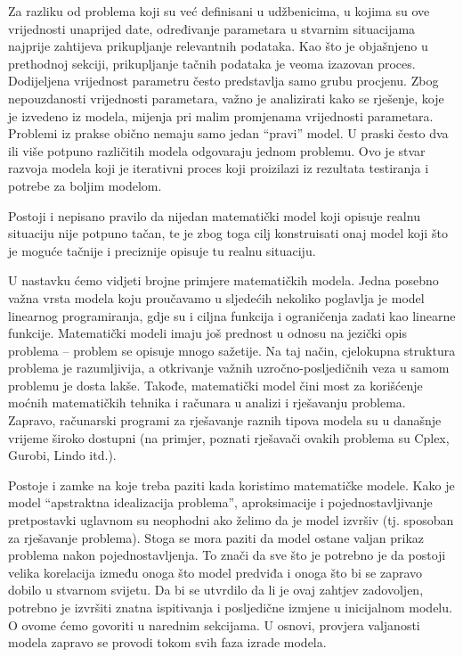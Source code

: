 \documentclass[a4paper, utf8, 11pt, colorlinks]{book}
\begin{document}
Za razliku od problema koji su već definisani u udžbenicima, u kojima su ove vrijednosti unaprijed date,   određivanje parametara u stvarnim situacijama najprije zahtijeva prikupljanje relevantnih podataka. Kao što je objašnjeno u prethodnoj sekciji,  prikupljanje tačnih podataka je veoma izazovan proces.  Dodijeljena vrijednost parametru često predstavlja  samo grubu procjenu. Zbog nepouzdanosti vrijednosti parametara, važno je analizirati kako se rješenje, koje je izvedeno iz modela, mijenja pri malim promjenama vrijednosti parametara. 
 Problemi iz prakse obično nemaju samo jedan ``pravi'' model.  U praski   često   dva ili više potpuno različitih modela odgovaraju jednom problemu. 
Ovo je stvar razvoja modela koji je iterativni proces koji proizilazi iz rezultata testiranja i potrebe za boljim modelom.

Postoji i nepisano pravilo da nijedan matematički model koji opisuje realnu situaciju nije potpuno tačan, te je zbog toga cilj konstruisati onaj model koji  što je moguće tačnije i preciznije opisuje tu realnu situaciju.


 U nastavku  ćemo vidjeti brojne primjere matematičkih modela. Jedna posebno važna vrsta modela koju proučavamo u sljedećih nekoliko poglavlja
je model linearnog programiranja, gdje su i ciljna funkcija i ograničenja zadati kao linearne funkcije. 
Matematički modeli imaju još prednost u odnosu na jezički opis problema -- problem se opisuje mnogo sažetije. Na taj način, cjelokupna struktura problema je razumljivija, a otkrivanje važnih uzročno-posljedičnih veza u samom problemu je dosta lakše. Takođe, matematički
model čini most za korišćenje moćnih matematičkih tehnika i računara u
analizi i rješavanju problema. Zapravo, računarski programi za rješavanje raznih tipova modela su  u današnje vrijeme  široko dostupni (na primjer, poznati rješavači ovakih problema su Cplex, Gurobi, Lindo itd.). 

  Postoje i zamke na koje treba paziti kada koristimo matematičke modele. Kako je model ``apstraktna idealizacija problema'', aproksimacije i pojednostavljivanje pretpostavki uglavnom su neophodni ako želimo da je model izvršiv (tj. sposoban za rješavanje problema). Stoga se mora paziti da model ostane valjan prikaz problema nakon pojednostavljenja. To znači da 
  sve što je potrebno je da postoji velika korelacija između onoga što model predviđa i onoga što bi se zapravo dobilo u stvarnom svijetu. Da bi se utvrdilo da li je ovaj zahtjev zadovoljen, potrebno je izvršiti znatna ispitivanja i posljedične izmjene u inicijalnom modelu. O ovome ćemo govoriti u narednim sekcijama. U osnovi, provjera valjanosti modela zapravo se provodi tokom svih  faza izrade modela. 
  
\end{document}
